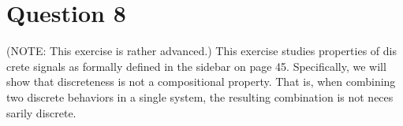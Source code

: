 \documentclass[12pt]{article}
\begin{document}


\vfil
\clearpage























\section{Question 8}
(NOTE: This exercise is rather advanced.) This exercise studies properties of dis
crete signals as formally defined in the sidebar on page 45. Specifically, we will
show that discreteness is not a compositional property. That is, when combining
two discrete behaviors in a single system, the resulting combination is not neces
sarily discrete.
\end{document}
